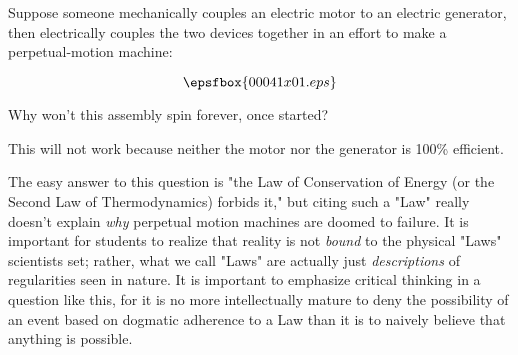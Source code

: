 

Suppose someone mechanically couples an electric motor to an electric generator, then electrically couples the two devices together in an effort to make a perpetual-motion machine:

$$\epsfbox{00041x01.eps}$$

Why won't this assembly spin forever, once started?







This will not work because neither the motor nor the generator is 100\% efficient.







The easy answer to this question is "the Law of Conservation of Energy (or the Second Law of Thermodynamics) forbids it," but citing such a "Law" really doesn't explain {\it why} perpetual motion machines are doomed to failure.  It is important for students to realize that reality is not {\it bound} to the physical "Laws" scientists set; rather, what we call "Laws" are actually just {\it descriptions} of regularities seen in nature.  It is important to emphasize critical thinking in a question like this, for it is no more intellectually mature to deny the possibility of an event based on dogmatic adherence to a Law than it is to naively believe that anything is possible.




